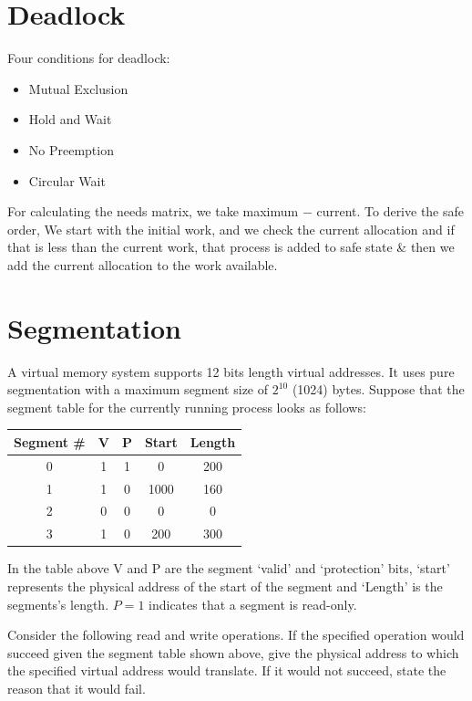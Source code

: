 \documentclass{article}
\begin{document}
\begin{multicols}{2}
    \section*{Deadlock}

    Four conditions for deadlock:
    \begin{itemize}
      \item Mutual Exclusion
      \item Hold and Wait
      \item No Preemption
      \item Circular Wait
    \end{itemize}

    For calculating the needs matrix, we take maximum $-$ current. To derive the safe order, We
    start with the initial work, and we check the current allocation and if that is less than the
    current work, that process is added to safe state \& then we add the current allocation to the
    work available.

    \section*{Segmentation}

    A virtual memory system supports 12 bits length virtual addresses. It uses pure segmentation
    with a maximum segment size of $2^{10}$ (1024) bytes. Suppose that the segment table for the
    currently running process looks as follows:

    \begin{tabular}{|c|c|c|c|c|}
      \hline
      Segment \# & V & P & Start & Length \\
      \hline
      0 & 1 & 1 & 0 & 200 \\
      \hline
      1 & 1 & 0 & 1000 & 160 \\
      \hline
      2 & 0 & 0 & 0 & 0 \\
      \hline
      3 & 1 & 0 & 200 & 300 \\
      \hline
    \end{tabular}

    In the table above V and P are the segment `valid' and `protection' bits, `start' represents the
    physical address of the start of the segment and `Length' is the segments's length. $P = 1$
    indicates that a segment is read-only.

    Consider the following read and write operations. If the specified operation would succeed given
    the segment table shown above, give the physical address to which the specified virtual address
    would translate. If it would not succeed, state the reason that it would fail.


\end{multicols}
\end{document}
